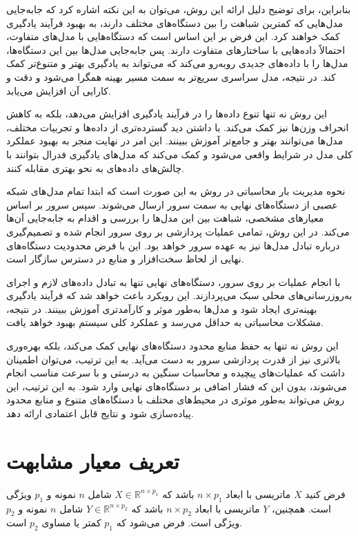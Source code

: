 بنابراین، برای توضیح دلیل ارائه این روش، می‌توان به این نکته اشاره کرد که جابه‌جایی مدل‌هایی که کمترین شباهت را بین دستگاه‌های مختلف دارند، به بهبود فرآیند یادگیری کمک خواهند کرد. این فرض بر این اساس است که دستگاه‌هایی با مدل‌های متفاوت، احتمالاً داده‌هایی با ساختارهای متفاوت دارند. پس جابه‌جایی مدل‌ها بین این دستگاه‌ها، مدل‌ها را با داده‌های جدیدی روبه‌رو می‌کند که می‌تواند به یادگیری بهتر و متنوع‌تر کمک کند. در نتیجه، مدل سراسری سریع‌تر به سمت مسیر بهینه همگرا می‌شود و دقت و کارایی آن افزایش می‌یابد.

این روش نه تنها تنوع داده‌ها را در فرآیند یادگیری افزایش می‌دهد، بلکه به کاهش انحراف وزن‌ها نیز کمک می‌کند. با داشتن دید گسترده‌تری از داده‌ها و تجربیات مختلف، مدل‌ها می‌توانند بهتر و جامع‌تر آموزش ببینند. این امر در نهایت منجر به بهبود عملکرد کلی مدل در شرایط واقعی می‌شود و کمک می‌کند که مدل‌های یادگیری فدرال بتوانند با چالش‌های داده‌های
به نحو بهتری مقابله کنند.


نحوه مدیریت بار محاسباتی در روش
به این صورت است که ابتدا تمام مدل‌های شبکه عصبی از دستگاه‌های نهایی به سمت سرور ارسال می‌شوند. سپس سرور بر اساس معیارهای مشخصی، شباهت بین این مدل‌ها را بررسی و اقدام به جابه‌جایی آن‌ها می‌کند. در این روش، تمامی عملیات پردازشی بر روی سرور انجام شده و تصمیم‌گیری درباره تبادل مدل‌ها نیز به عهده سرور خواهد بود. این با فرض محدودیت دستگاه‌های نهایی از لحاظ سخت‌افزار و منابع در دسترس سازگار است.

با انجام عملیات بر روی سرور، دستگاه‌های نهایی تنها به تبادل داده‌های لازم و اجرای به‌روزرسانی‌های محلی سبک می‌پردازند. این رویکرد باعث خواهد شد که فرآیند یادگیری بهینه‌تری ایجاد شود و مدل‌ها به‌طور موثر و کارآمدتری آموزش ببینند. در نتیجه، مشکلات محاسباتی به حداقل می‌رسد و عملکرد کلی سیستم بهبود خواهد یافت.

این روش نه تنها به حفظ منابع محدود دستگاه‌های نهایی کمک می‌کند، بلکه بهره‌وری بالاتری نیز از قدرت پردازشی سرور به دست می‌آید. به این ترتیب، می‌توان اطمینان داشت که عملیات‌های پیچیده و محاسبات سنگین به درستی و با سرعت مناسب انجام می‌شوند، بدون این که فشار اضافی بر دستگاه‌های نهایی وارد شود. به این ترتیب، این روش می‌تواند به‌طور موثری در محیط‌های مختلف با دستگاه‌های متنوع و منابع محدود پیاده‌سازی شود و نتایج قابل اعتمادی ارائه دهد.



\section{
	تعریف معیار مشابهت
}
فرض کنید \( X \) ماتریسی با ابعاد \( n \times p_1 \) باشد که \( X \in \mathbb{R}^{n \times p_1} \) شامل \( n \) نمونه و \( p_1 \) ویژگی است. همچنین، \( Y \) ماتریسی با ابعاد \( n \times p_2 \) باشد که \( Y \in \mathbb{R}^{n \times p_2} \) شامل \( n \) نمونه و \( p_2 \) ویژگی است. فرض می‌شود که \( p_1 \) کمتر یا مساوی \( p_2 \) است.


